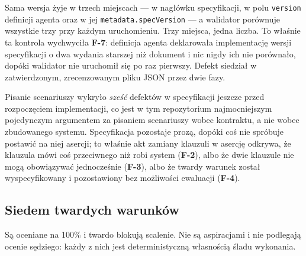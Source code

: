 \documentclass[11pt,a4paper]{article}
\newcommand{\finding}[1]{{\color{primaryblue}\textbf{#1}}}
\begin{document}
Sama wersja żyje w trzech miejscach --- w nagłówku specyfikacji, w polu \texttt{version} definicji agenta oraz w jej \texttt{metadata.specVersion} --- a walidator porównuje wszystkie trzy przy każdym uruchomieniu. Trzy miejsca, jedna liczba. To właśnie ta kontrola wychwyciła \finding{F-7}: definicja agenta deklarowała implementację wersji specyfikacji o dwa wydania starszej niż dokument i nic nigdy ich nie porównało, dopóki walidator nie uruchomił się po raz pierwszy. Defekt siedział w zatwierdzonym, zrecenzowanym pliku JSON przez dwie fazy.

Pisanie scenariuszy wykryło \emph{sześć} defektów w specyfikacji jeszcze przed rozpoczęciem implementacji, co jest w tym repozytorium najmocniejszym pojedynczym argumentem za pisaniem scenariuszy wobec kontraktu, a nie wobec zbudowanego systemu. Specyfikacja pozostaje prozą, dopóki coś nie spróbuje postawić na niej asercji; to właśnie akt zamiany klauzuli w asercję odkrywa, że klauzula mówi coś przeciwnego niż robi system (\finding{F-2}), albo że dwie klauzule nie mogą obowiązywać jednocześnie (\finding{F-3}), albo że twardy warunek został wyspecyfikowany i pozostawiony bez możliwości ewaluacji (\finding{F-4}).

\subsection{Siedem twardych warunków}

Są oceniane na 100\% i twardo blokują scalenie. Nie są aspiracjami i nie podlegają ocenie sędziego: każdy z nich jest deterministyczną własnością śladu wykonania.
\end{document}
